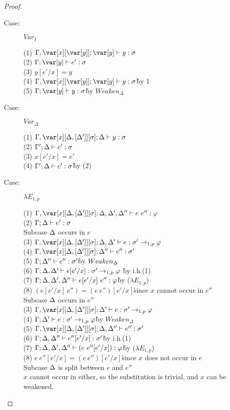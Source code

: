\begin{proof}
\begin{description}
\item[Case:] $Var_1$
\begin{tabbing}
  (1) $\G,\x[\y]; \y \vdash y : \s$\\
  (2) $\G; \y \vdash e' : \s$\\
  (3) $y[e'/x] = y$\\
  (4) $\G,\x[\y]; \y \vdash y : \s$\`by 1\\ 
  (5) $\G; \y\vdash y : \s$\` by $Weaken_\Delta$\\
\end{tabbing}

\item[Case:] $Var_\Delta$
\begin{tabbing}
    (1) $\G, \xD; \D \vdash y : \s$\\
    (2) $\Gamma'; \Delta \vdash e' : \sigma$\\
    (3) $x[e'/x] = e'$\\
    (4) $\Gamma'; \Delta \vdash e' : \sigma$\` by (2)\\
\end{tabbing}


\item[Case:] $\lambda E_{1,p}$
\begin{tabbing}
    (1) $\G, \xD; \D,\D',\D'' \vdash e~e'' : \varphi$\\
    (2) $\Gamma; \Delta \vdash e' : \sigma$\\
    Subcase $\Delta$ occurs in $e$\\
    (3) $\G, \xD; \D,\D' \vdash e : \s' \to_{1,p} \vp$\\
    (4) $\G, \xD; \D'' \vdash e'' : \s'$\\
    (5) $\Gamma; \Delta'' \vdash e'' : \sigma'$\` by $Weaken_\Delta$\\
    (6) $\Gamma; \Delta,\Delta' \vdash e[e'/x] : \sigma' \to_{1,p} \varphi$ \` by i.h.(1)\\
    (7) $\Gamma;\Delta, \Delta', \Delta'' \vdash e[e'/x]~e'' : \varphi$\` by ($\lambda E_{1,p}$)\\
    (8) $(e[e'/x]~e'')=(e~e'')[e'/x]$\` since $x$ cannot occur in $e''$\\
    Subcase $\Delta$ occurs in $e''$\\
    (3) $\G, \xD; \D' \vdash e : \s' \to_{1,p} \vp$\\
    (4) $\Gamma; \Delta' \vdash e : \sigma' \to_{1,p} \varphi$\` by $Weaken_\Delta$\\
    (5) $\G,\xD; \D, \D'' \vdash e'' : \s'$\\
    (6) $\Gamma; \Delta, \Delta'' \vdash e''[e'/x] : \sigma'$\` by i.h.(1)\\
    (7) $\Gamma; \Delta,\Delta',\Delta'' \vdash (e~e''[e'/x]) : \varphi$\` by ($\lambda E_{1,p}$)\\
    (8) $e~e''[e'/x] = (e~e'')[e'/x]$\`since $x$ does not occur in $e$\\
    Subcase $\Delta$ is split between $e$ and $e''$\\
    $x$ cannot occur in either, so the substitution is trivial, and $x$ can be weakened.


\end{tabbing}
\end{description}
\end{proof}

